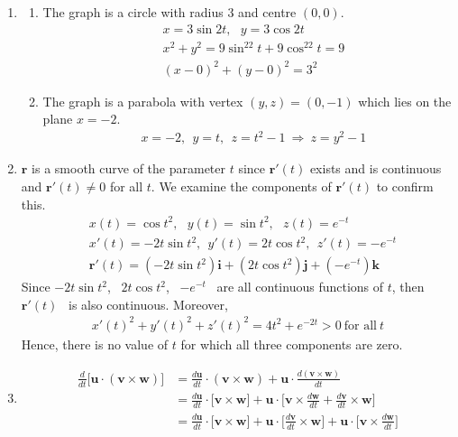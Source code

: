 \documentclass[12pt]{amsart}
\begin{document}
\begin{enumerate}
	\item 
	
		\begin{enumerate}
		
			\item The graph is a circle with radius 3 and centre $(0,0)$.
				\begin{align*}
					&x=3\sin2t, \ \ \ y=3\cos2t \\
					&x^2+y^2=9\sin^22t+9\cos^22t=9 \\
					&(x-0)^2+(y-0)^2=3^2
				\end{align*}
			
			\item The graph is a parabola with vertex $(y,z)=(0,-1)$ which lies on the plane $x=-2$.
				\begin{align*}
					&x=-2, \ \ y=t, \ \ z=t^2-1 \ \Rightarrow \ z=y^2-1
				\end{align*}
		
		\end{enumerate}
				
	\item $\mathbf{r}$ is a smooth curve of the parameter $t$ since $\mathbf{r}'(t)$ exists and is continuous 			and $\mathbf{r}'(t)\ne0$ for all $t$. We examine the components of $\mathbf{r}'(t)$ to confirm this.
		\begin{align*}
			&x(t)=\cos t^2, \ \ \ y(t)=\sin t^2, \ \ \ z(t)=e^{-t} \\
			&x'(t)=-2t\sin t^2, \ \ y'(t)=2t\cos t^2, \ \ z'(t)=-e^{-t} \\
			&\mathbf{r}'(t)=(-2t\sin t^2)\mathbf{i}+(2t\cos t^2)\mathbf{j}+(-e^{-t})\mathbf{k}
		\end{align*}
		Since $-2t\sin t^2$, \ $2t\cos t^2$, \ $-e^{-t}$ \ are all continuous functions of $t$, then $\mathbf{r}'(t)$ \ 		is also continuous. Moreover,
		\begin{align*}
			x'(t)^2+y'(t)^2+z'(t)^2=4t^2+e^{-2t} > 0 \ \text{for all} \ t
		\end{align*}
		Hence, there is no value of $t$ for which all three components are zero.
	\item
		\begin{align*}
			\frac{d }{dt}\big[\mathbf{u}\cdot(\mathbf{v}\times\mathbf{w})\big]&=\frac{d\mathbf{u}}{dt}\cdot
			(\mathbf{v}\times\mathbf{w})+\mathbf{u}\cdot\frac{d(\mathbf{v}\times\mathbf{w})}{dt} \\
			&=\frac{d\mathbf{u}}{dt}\cdot\big[\mathbf{v}\times\mathbf{w}\big]+\mathbf{u}\cdot\Big[\mathbf{v}
			\times\frac{d\mathbf{w}}{dt}+\frac{d\mathbf{v}}{dt}\times\mathbf{w}\Big] \\
			&=\frac{d\mathbf{u}}{dt}\cdot\big[\mathbf{v}\times\mathbf{w}\big]+\mathbf{u}\cdot\Big[
			\frac{d\mathbf{v}}{dt}\times\mathbf{w}\Big]+ \mathbf{u}\cdot\Big[\mathbf{v}\times\frac{d\mathbf{w}}			{dt}\Big]
		\end{align*}
				

\end{enumerate}
\end{document}
